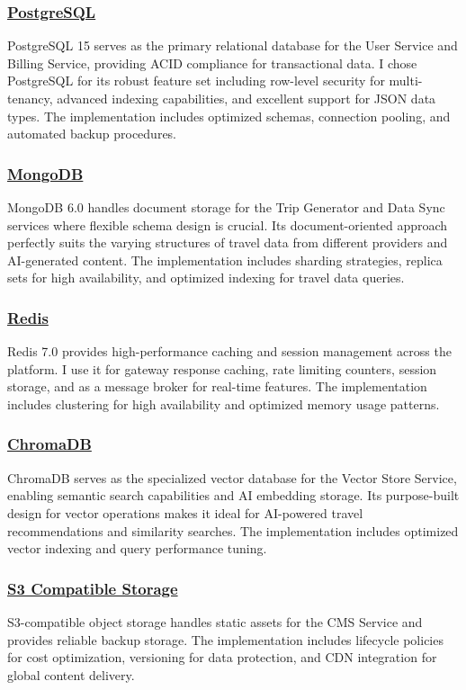 \subsubsection*{\underline{PostgreSQL}}
PostgreSQL 15 serves as the primary relational database for the User Service and Billing Service, providing ACID compliance for transactional data. I chose PostgreSQL for its robust feature set including row-level security for multi-tenancy, advanced indexing capabilities, and excellent support for JSON data types. The implementation includes optimized schemas, connection pooling, and automated backup procedures.

\subsubsection*{\underline{MongoDB}}
MongoDB 6.0 handles document storage for the Trip Generator and Data Sync services where flexible schema design is crucial. Its document-oriented approach perfectly suits the varying structures of travel data from different providers and AI-generated content. The implementation includes sharding strategies, replica sets for high availability, and optimized indexing for travel data queries.

\subsubsection*{\underline{Redis}}
Redis 7.0 provides high-performance caching and session management across the platform. I use it for gateway response caching, rate limiting counters, session storage, and as a message broker for real-time features. The implementation includes clustering for high availability and optimized memory usage patterns.

\subsubsection*{\underline{ChromaDB}}
ChromaDB serves as the specialized vector database for the Vector Store Service, enabling semantic search capabilities and AI embedding storage. Its purpose-built design for vector operations makes it ideal for AI-powered travel recommendations and similarity searches. The implementation includes optimized vector indexing and query performance tuning.

\subsubsection*{\underline{S3 Compatible Storage}}
S3-compatible object storage handles static assets for the CMS Service and provides reliable backup storage. The implementation includes lifecycle policies for cost optimization, versioning for data protection, and CDN integration for global content delivery.

